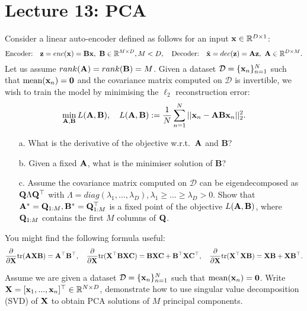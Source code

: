 \section{Lecture 13: PCA}

\newcommand{\BB}{\mathbf B}
\newcommand{\BX}{\mathbf X}
\newcommand{\BC}{\mathbf C}
\newcommand{\BU}{\mathbf U}

\begin{question}
\label{q:pca_vs_linear_autoencoder}
Consider a linear auto-encoder defined as follows for an input $\mathbf{x} \in \mathbb{R}^{D \times 1}$:
$$\text{Encoder:} \quad \z = enc(\x) = \BB \x, \ \BB \in \mathbb{R}^{M \times D}, M < D, \quad \text{Decoder:} \quad \hat{\x} = dec(\z) = \BA \z, \ \BA \in \mathbb{R}^{D \times M}.$$
Let us assume $rank(\BA) = rank(\BB) = M$.
Given a dataset $\mathcal{D} = \{ \mathbf{x}_n \}_{n=1}^N$ such that $\text{mean}(\mathbf{x}_n) = \bm{0}$ and the covariance matrix computed on $\mathcal{D}$ is invertible, we wish to train the model by minimising the $\ell_2$ reconstruction error:
$$\min_{\BA, \BB} L(\BA, \BB), \quad L(\BA, \BB) := \frac{1}{N} \sum_{n=1}^N || \x_n - \BA \BB \x_n ||_2^2.$$
%
\begin{itemize}
\item[a.] What is the derivative of the objective w.r.t.~$\mathbf A$ and $\BB$?
\item[b.] Given a fixed $\mathbf A$, what is the minimiser solution of $\BB$?
\item[c.] Assume the covariance matrix computed on $\mathcal{D}$ can be eigendecomposed as $\mathbf{Q} \Lambda \mathbf{Q}^\top$ with $\Lambda = diag(\lambda_1, ..., \lambda_D), \lambda_1 \geq ... \geq \lambda_D > 0$. Show that $\BA^* = \BQ_{1:M}, \BB^* = \BQ_{1:M}^{\top}$ is a fixed point of the objective $L(\BA, \BB)$, where $\mathbf{Q}_{1:M}$ contains the first $M$ columns of $\mathbf{Q}$.
\end{itemize}
%
You might find the following formula useful:
$$\frac{\partial}{\partial \BX} \tr(\BA \BX \BB) = \BA^\top \BB^\top, \quad \frac{\partial}{\partial \BX} \tr(\BX^\top \BB \BX \BC) = \BB \BX \BC + \BB^\top \BX \BC^\top, \quad \frac{\partial}{\partial \BX} \tr(\BX^\top \BX \BB) = \BX \BB + \BX \BB^\top.$$

\end{question}


\begin{question}
\label{q:svd_and_pca}
Assume we are given a dataset $\mathcal{D} = \{ \mathbf{x}_n \}_{n=1}^N$ such that $\text{mean}(\mathbf{x}_n) = \bm{0}$. Write $\BX = [\x_1, ..., \x_n]^\top \in \mathbb{R}^{N \times D}$, demonstrate how to use singular value decomposition (SVD) of $\mathbf{X}$ to obtain PCA solutions of $M$ principal components.  
\end{question}